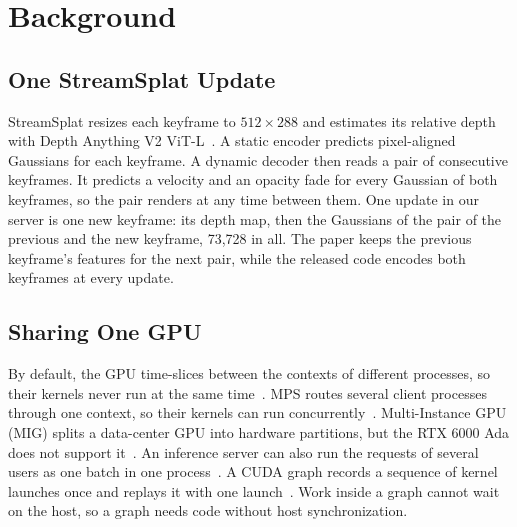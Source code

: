 \section{Background}
\label{sec:background}

\subsection{One StreamSplat Update}

StreamSplat resizes each keyframe to $512\times288$ and estimates its relative depth with Depth Anything V2 ViT-L~\cite{streamsplat2026,depthanythingv2}. %
A static encoder predicts pixel-aligned Gaussians for each keyframe.
A dynamic decoder then reads a pair of consecutive keyframes.
It predicts a velocity and an opacity fade for every Gaussian of both keyframes, so the pair renders at any time between them.
One update in our server is one new keyframe: its depth map, then the Gaussians of the pair of the previous and the new keyframe, 73,728 in all. %
The paper keeps the previous keyframe's features for the next pair, while the released code encodes both keyframes at every update.

\subsection{Sharing One GPU}

By default, the GPU time-slices between the contexts of different processes, so their kernels never run at the same time~\cite{nvidia_mps}.
MPS routes several client processes through one context, so their kernels can run concurrently~\cite{nvidia_mps}.
Multi-Instance GPU (MIG) splits a data-center GPU into hardware partitions, but the RTX 6000 Ada does not support it~\cite{nvidia_mig}.
An inference server can also run the requests of several users as one batch in one process~\cite{clockwork2020}.
A CUDA graph records a sequence of kernel launches once and replays it with one launch~\cite{nvidia_cuda_guide}.
Work inside a graph cannot wait on the host, so a graph needs code without host synchronization.
